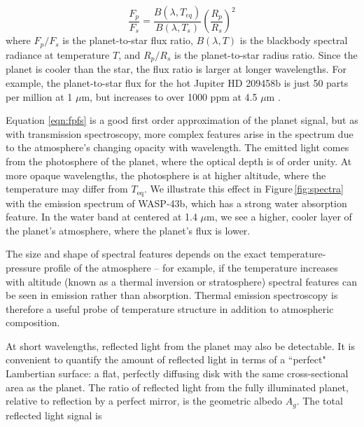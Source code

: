 \documentclass[graybox,natbib,nosecnum]{svmult}
\newcommand{\hbindex}[1]{\hl{#1}\index{#1}}  %
\begin{document}
\begin{equation}
\label{eqn:fpfs}
\frac{F_p}{F_s} = \frac{B(\lambda, T_{eq})}{B(\lambda, T_s)}\left(\frac{R_p}{R_s}\right)^2
\end{equation}
where $F_p/F_s$ is the planet-to-star flux ratio, $B(\lambda, T)$ is the blackbody spectral radiance at temperature $T$, and $R_p/R_s$ is the planet-to-star radius ratio. Since the planet is cooler than the star, the flux ratio is larger at longer wavelengths. For example, the planet-to-star flux for the hot Jupiter HD 209458b is just 50 parts per million at 1 $\mu$m, but increases to over 1000 ppm at 4.5 $\mu$m \citep{line16}.

Equation \ref{eqn:fpfs} is a good first order approximation of the planet signal, but as with transmission spectroscopy, more complex features arise in the spectrum due to the atmosphere's changing opacity with wavelength. The emitted light comes from the photosphere of the planet, where the optical depth is of order unity. At more opaque wavelengths, the photosphere is at higher altitude, where the temperature may differ from $T_\mathrm{eq}$. We illustrate this effect in Figure\,\ref{fig:spectra} with the emission spectrum of WASP-43b, which has a strong water absorption feature. In the water band at centered at 1.4 $\mu$m, we see a higher, cooler layer of the planet's atmosphere, where the planet's flux is lower.

The size and shape of spectral features depends on the exact temperature-pressure profile of the atmosphere -- for example, if the temperature increases with altitude (known as a thermal inversion or stratosphere) spectral features can be seen in emission rather than absorption. Thermal emission spectroscopy is therefore a useful probe of temperature structure in addition to atmospheric composition.


At short wavelengths, reflected light from the planet may also be detectable. It is convenient to quantify the amount of reflected light in terms of a ``perfect" Lambertian surface: a flat, perfectly diffusing disk with the same cross-sectional area as the planet. The ratio of reflected light from the fully illuminated planet, relative to reflection by a perfect mirror, is the geometric albedo $A_g$. The total reflected light signal is
\end{document}
